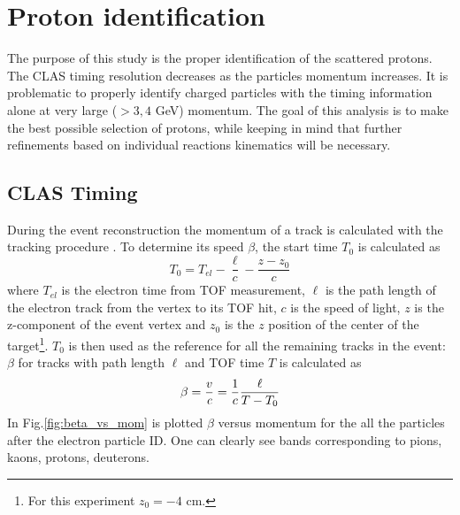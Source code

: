 \section{Proton identification}

The purpose of this study is the proper identification of the
scattered protons. The CLAS timing resolution decreases as the
particles momentum increases. It is problematic to properly identify
charged particles with the timing  information alone at very large ($> 3, 4$ GeV) momentum.
The goal of this analysis is to make the best possible selection of protons, while keeping
in mind that further refinements based on individual reactions kinematics will be necessary.


\subsection{CLAS Timing}
\label{sec:clas_timing}


During the event reconstruction the momentum of a track is calculated 
with the tracking procedure \cite{bib:tracking}. To determine its speed $\beta$,
the start time $T_0$ is calculated as
\begin{equation}
 T_0 = T_{el} - \frac{\ell}{c} - \frac{z-z_0}{c}
\end{equation}
where $T_{el}$ is the electron time from TOF measurement, $\ell$ is the
path length of the electron track from the vertex to its TOF hit, $c$ is
the speed of light, $z$ is the z-component of the event vertex and $z_0$ 
is the $z$ position of the center of the 
target\footnote{For this experiment $z_0 = -4$ cm.}. $T_0$ is then used 
as the reference for all the remaining tracks in the event: $\beta$ for tracks 
with path length $\ell$ and TOF time $T$ is calculated as
\begin{equation}
 \beta = \frac{v}{\it c} = \frac{1}{c} \frac{\ell}{T-T_0}
\end{equation}
In  Fig.\ref{fig:beta_vs_mom} is plotted $\beta$ versus momentum for the all the 
particles after the electron particle ID. One can clearly see bands corresponding 
to pions, kaons, protons, deuterons.


